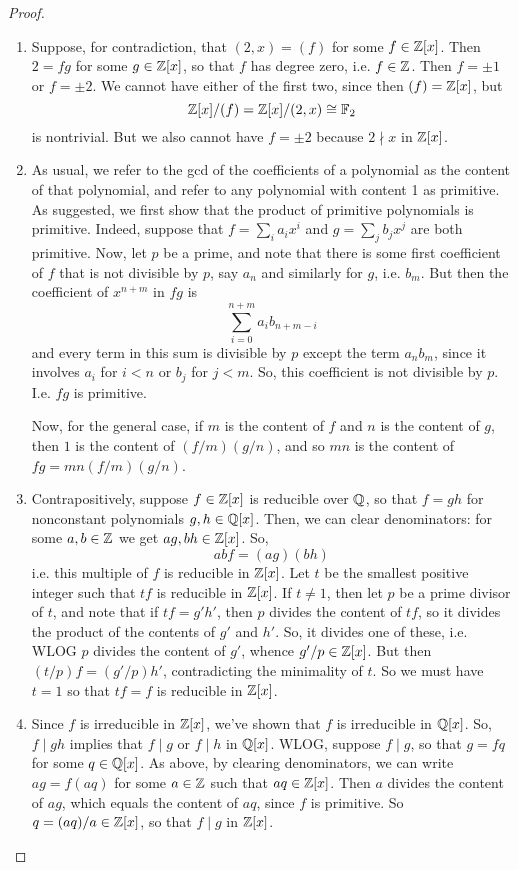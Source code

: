 \begin{proof} ${}$
\begin{enumerate}
\item Suppose, for contradiction, that $(2,x) = (f)$ for some $f \in \mathbb{Z}[x]$. Then $2 = fg$ for some $g \in \mathbb{Z}[x]$, so that $f$ has degree zero, i.e. $f \in \mathbb{Z}$. Then $f = \pm 1$ or $f = \pm 2$. We cannot have either of the first two, since then $(f) = \mathbb{Z}[x]$, but
\[ \mathbb{Z}[x]/(f) = \mathbb{Z}[x]/(2,x) \cong \mathbb{F}_2 \]
is nontrivial. But we also cannot have $f = \pm 2$ because $2 \nmid x$ in $\mathbb{Z}[x]$.

\item As usual, we refer to the gcd of the coefficients of a polynomial as the content of that polynomial, and refer to any polynomial with content 1 as primitive. As suggested, we first show that the product of primitive polynomials is primitive. Indeed, suppose that $f = \sum_i a_ix^i$ and $g = \sum_j b_jx^j$ are both primitive. Now, let $p$ be a prime, and note that there is some first coefficient of $f$ that is not divisible by $p$, say $a_n$ and similarly for $g$, i.e. $b_m$. But then the coefficient of $x^{n+m}$ in $fg$ is
\[ \sum_{i=0}^{n+m} a_ib_{n+m-i} \]
and every term in this sum is divisible by $p$ except the term $a_nb_m$, since it involves $a_i$ for $i<n$ or $b_j$ for $j<m$. So, this coefficient is not divisible by $p$. I.e. $fg$ is primitive.

Now, for the general case, if $m$ is the content of $f$ and $n$ is the content of $g$, then $1$ is the content of $(f/m)(g/n)$, and so $mn$ is the content of $fg = mn(f/m)(g/n)$.

\item Contrapositively, suppose $f \in \mathbb{Z}[x]$ is reducible over $\mathbb{Q}$, so that $f = gh$ for nonconstant polynomials $g,h \in \mathbb{Q}[x]$. Then, we can clear denominators: for some $a,b \in \mathbb{Z}$ we get $ag,bh \in \mathbb{Z}[x]$. So,
\[ abf = (ag)(bh) \]
i.e. this multiple of $f$ is reducible in $\mathbb{Z}[x]$. Let $t$ be the smallest positive integer such that $tf$ is reducible in $\mathbb{Z}[x]$. If $t \neq 1$, then let $p$ be a prime divisor of $t$, and note that if $tf = g'h'$, then $p$ divides the content of $tf$, so it divides the product of the contents of $g'$ and $h'$. So, it divides one of these, i.e. WLOG $p$ divides the content of $g'$, whence $g'/p \in \mathbb{Z}[x]$. But then $(t/p)f = (g'/p)h'$, contradicting the minimality of $t$. So we must have $t = 1$ so that $tf = f$ is reducible in $\mathbb{Z}[x]$.

\item Since $f$ is irreducible in $\mathbb{Z}[x]$, we've shown that $f$ is irreducible in $\mathbb{Q}[x]$. So, $f \mid gh$ implies that $f \mid g$ or $f \mid h$ in $\mathbb{Q}[x]$. WLOG, suppose $f \mid g$, so that $g = fq$ for some $q \in \mathbb{Q}[x]$. As above, by clearing denominators, we can write $ag = f(aq)$ for some $a \in \mathbb{Z}$ such that $aq \in \mathbb{Z}[x]$. Then $a$ divides the content of $ag$, which equals the content of $aq$, since $f$ is primitive. So $q = (aq)/a \in \mathbb{Z}[x]$, so that $f \mid g$ in $\mathbb{Z}[x]$.


\end{enumerate}
\end{proof}
